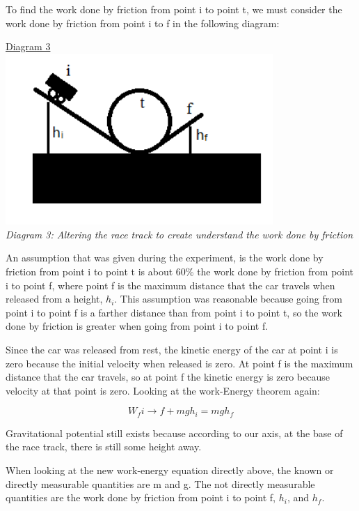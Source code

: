 \documentclass[aps,letterpaper,11pt]{revtex4}
\begin{document}
To find the work done by friction from point i to point t, we must consider the work done by friction from point i to f in the following diagram:

\begin{center}
\underline{Diagram 3}\\
\includegraphics[width=4in]{WorkFromIToF.png}\\
\textit{Diagram 3: Altering the race track to create understand the work done by friction}
\end{center}

An assumption that was given during the experiment, is the work done by friction from point i to point t is about 60\% the work done by friction from point i to point f, where point f is the maximum distance that the car travels when released from a height, $h_i$. This assumption was reasonable because going from point i to point f is a farther distance than from point i to point t, so the work done by friction is greater when going from point i to point f. 

Since the car was released from rest, the kinetic energy of the car at point i is zero because the initial velocity when released is zero. At point f is the maximum distance that the car travels, so at point f the kinetic energy is zero because velocity at that point is zero. Looking at the work-Energy theorem again:

$$ W_fi \rightarrow f + mgh_i = mgh_f$$

Gravitational potential still exists because according to our axis, at the base of the race track, there is still some height away. 

When looking at the new work-energy equation directly above, the known or directly measurable quantities are m and g. The not directly measurable quantities are the work done by friction from point i to point f, $h_i$, and $h_f$.
\end{document}
